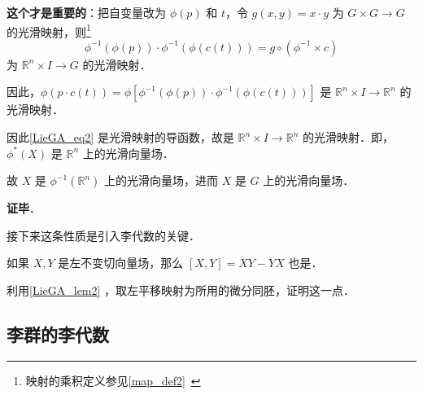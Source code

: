 \textbf{这个才是重要的}：把自变量改为 $\phi(p)$ 和 $t$，令 $g(x, y)=x\cdot y$ 为 $G\times G\to G$ 的光滑映射，则\footnote{映射的乘积定义参见\autoref{map_def2}~}
\begin{equation}
\phi^{-1}(\phi(p))\cdot \phi^{-1}(\phi(c(t)))=g\circ(\phi^{-1}\times c)
\end{equation}
为 $\mathbb{R}^n\times I\to G$ 的光滑映射．

因此，$\phi(p\cdot c(t))=\phi[\phi^{-1}(\phi(p))\cdot \phi^{-1}(\phi(c(t)))]$ 是 $\mathbb{R}^n\times I\to \mathbb{R}^n$ 的光滑映射．

因此\autoref{LieGA_eq2} 是光滑映射的导函数，故是 $\mathbb{R}^n\times I\to \mathbb{R}^n$ 的光滑映射．即，$\phi^*(X)$ 是 $\mathbb{R}^n$ 上的光滑向量场．

故 $X$ 是 $\phi^{-1}(\mathbb{R}^n)$ 上的光滑向量场，进而 $X$ 是 $G$ 上的光滑向量场．









\textbf{证毕}．

接下来这条性质是引入李代数的关键．

\begin{exercise}{}
如果 $X, Y$ 是左不变切向量场，那么 $[X, Y]=XY-YX$ 也是．

利用\autoref{LieGA_lem2} ，取左平移映射为所用的微分同胚，证明这一点．
\end{exercise}


\subsection{李群的李代数}

